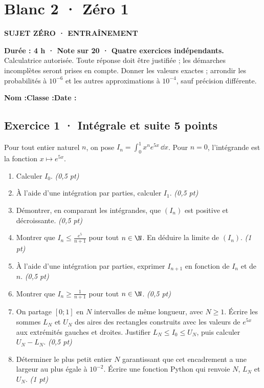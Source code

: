 \clearpage{}\label{sujet:8-1}

\section*{Blanc 2 · Zéro 1}

{\sffamily\bfseries\color{teal}SUJET ZÉRO · ENTRAÎNEMENT\par}

\textbf{Durée : 4 h · Note sur 20 · Quatre exercices indépendants.}\\Calculatrice autorisée. Toute réponse doit être justifiée ; les démarches incomplètes seront prises en compte. Donner les valeurs exactes ; arrondir les probabilités à $10^{-6}$ et les autres approximations à $10^{-4}$, sauf précision différente.

\smallskip\textbf{Nom :}\enspace\dotfill\quad\textbf{Classe :}\enspace\dotfill\quad\textbf{Date :}\enspace\dotfill

\subsection*{Exercice 1 · Intégrale et suite \hfill 5 points}Pour tout entier naturel $n$, on pose $I_n=\displaystyle\int_0^1x^ne^{5x}\,\dd x$. Pour $n=0$, l'intégrande est la fonction $x\mapsto e^{5x}$.

\begin{enumerate}

\item Calculer $I_0$. \hfill\textit{(0,5 pt)}

\item À l'aide d'une intégration par parties, calculer $I_1$. \hfill\textit{(0,5 pt)}

\item Démontrer, en comparant les intégrandes, que $(I_n)$ est positive et décroissante. \hfill\textit{(0,5 pt)}

\item Montrer que $I_n\le\frac{e^{5}}{n+1}$ pour tout $n\in\N$. En déduire la limite de $(I_n)$. \hfill\textit{(1 pt)}

\item À l'aide d'une intégration par parties, exprimer $I_{n+1}$ en fonction de $I_n$ et de $n$. \hfill\textit{(0,5 pt)}

\item Montrer que $I_n\ge\frac1{n+1}$ pour tout $n\in\N$. \hfill\textit{(0,5 pt)}

\item On partage $[0;1]$ en $N$ intervalles de même longueur, avec $N\ge1$. Écrire les sommes $L_N$ et $U_N$ des aires des rectangles construits avec les valeurs de $e^{5x}$ aux extrémités gauches et droites. Justifier $L_N\le I_0\le U_N$, puis calculer $U_N-L_N$. \hfill\textit{(0,5 pt)}

\item Déterminer le plus petit entier $N$ garantissant que cet encadrement a une largeur au plus égale à $10^{-2}$. Écrire une fonction Python qui renvoie $N$, $L_N$ et $U_N$. \hfill\textit{(1 pt)}

\end{enumerate}

